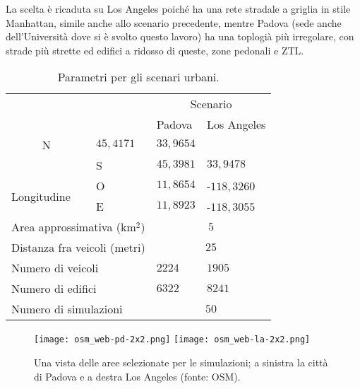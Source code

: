 La scelta è ricaduta su Los Angeles poiché ha una rete stradale a griglia in stile Manhattan, simile anche allo scenario precedente,
mentre Padova (sede anche dell'Università dove si è svolto questo lavoro) ha una toplogià più irregolare, con strade più strette ed edifici a ridosso di queste,
zone pedonali e ZTL.
%
\begin{table}[htbp]
	\centering
	  \begin{tabular}{| m{.35\linewidth} | p{.01\linewidth} | p{.04\linewidth} | p{.15\linewidth} | p{.15\linewidth} |}
			\toprule
			\multicolumn{3}{|m{.3\linewidth}|}{\multirow{2}{*}{}}														&		\multicolumn{2}{c|}{Scenario}						\\ \cline{4-5}
			\multicolumn{3}{|m{.3\linewidth}|}{}																						&		Padova				&			Los Angeles					\\
			\thickerline
			\multicolumn{2}{|m{.25\linewidth}|}{\multirow{2}{*}{Latitudine}}				&		N	 	& 	$45,4171$				&			$33,9654$					\\ \cline{3-5}
			\multicolumn{2}{|m{.25\linewidth}|}{}																		&		S	 	& 	$45,3981$				&			$33,9478$					\\ \hline
			\multicolumn{2}{|l|}{\multirow{2}{*}{Longitudine}}											&		O	 	& 	$11,8654$				&			-$118,3260$				\\ \cline{3-5}
			\multicolumn{2}{|l|}{}																									&		E	 	& 	$11,8923$				&			-$118,3055$				\\ \hline
			\multicolumn{3}{|l|}{Area approssimativa (km$^2$)}															&		\multicolumn{2}{c|}{$5$}								\\ \hline
			\multicolumn{3}{|l|}{Distanza fra veicoli (metri)}															&		\multicolumn{2}{c|}{$25$}								\\ \hline
			\multicolumn{3}{|l|}{Numero di veicoli}																					&		$2224$					&					$1905$				\\ \hline
			\multicolumn{3}{|l|}{Numero di edifici}																					&		$6322$					&					$8241$				\\ \hline
			\multicolumn{3}{|l|}{Numero di simulazioni}																			&		\multicolumn{2}{c|}{$50$}								\\
			\bottomrule
	  \end{tabular}
	\caption{Parametri per gli scenari urbani.\label{tab:parametri-simulazioni-pd-la}}
\end{table}
%
\begin{figure}[htbp]
	\centering
		\texttt{[image: osm\_web-pd-2x2.png]}
		\hfill
		\texttt{[image: osm\_web-la-2x2.png]}
\caption{Una vista delle aree selezionate per le simulazioni; a sinistra la città di Padova e a destra Los Angeles (fonte: OSM).\label{fig:scenari-la-pd-osm}}
\end{figure}
